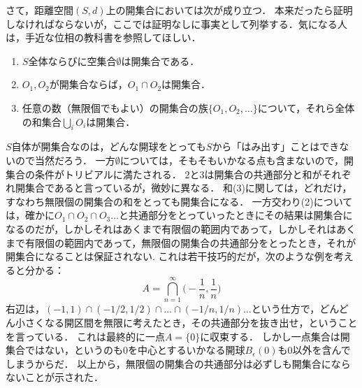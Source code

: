 \documentclass[11pt,a4paper, dvipdfmx]{jsarticle}
\begin{document}
さて，距離空間$(S, d)$上の開集合においては次が成り立つ．
本来だったら証明しなければならないが，ここでは証明なしに事実として列挙する．気になる人は，手近な位相の教科書を参照してほしい．
\begin{enumerate}
 \item $S$全体ならびに空集合$\emptyset$は開集合である．
 \item $O_1, O_2$が開集合ならば，$O_1 \cap O_2$は開集合．
 \item 任意の数（無限個でもよい）の開集合の族$\{ O_1, O_2, \dots \}$について，それら全体の和集合$\bigcup_i O_i$は開集合．
\end{enumerate}
$S$自体が開集合なのは，どんな開球をとっても$S$から「はみ出す」ことはできないので当然だろう．
一方$\emptyset$については，そもそもいかなる点も含まないので，開集合の条件がトリビアルに満たされる．
2と3は開集合の共通部分と和がそれぞれ開集合であると言っているが，微妙に異なる．
和(3)に関しては，どれだけ，すなわち無限個の開集合の和をとっても開集合になる．
一方交わり(2)については，確かに$O_1 \cap O_2 \cap O_3 \dots$と共通部分をとっていったときにその結果は開集合になるのだが，しかしそれはあくまで有限個の範囲内であって，しかしそれはあくまで有限個の範囲内であって，無限個の開集合の共通部分をとったとき，それが開集合になることは保証されない.
これは若干技巧的だが，次のような例を考えると分かる：
\[ A = \bigcap_{n=1}^{\infty} \bigg( -\frac{1}{n}, \frac{1}{n} \bigg) \]
右辺は，$(-1, 1) \cap (-1/2, 1/2) \cap \dots \cap (-1/n,1/n) \dots$という仕方で，どんどん小さくなる開区間を無限に考えたとき，その共通部分を抜き出せ，ということを言っている．
これは最終的に一点$A=\{0\}$に収束する．
しかし一点集合は開集合ではない，というのも0を中心とするいかなる開球$B_\epsilon(0)$も0以外を含んでしまうからだ．
以上から，無限個の開集合の共通部分は必ずしも開集合にならないことが示された．

\end{document}
